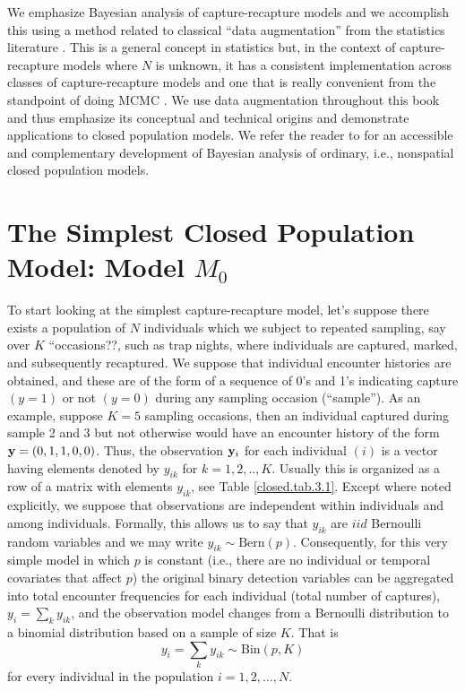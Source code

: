 We emphasize Bayesian analysis of capture-recapture models and we
accomplish this using a method related to classical ``data
augmentation'' from the statistics literature 
\citep[e.g.,][]{tanner_wong:1987}.  This is a general concept in
statistics but, in the context of capture-recapture models where $N$
is unknown, it has a consistent implementation across classes of
capture-recapture models and one that is really convenient from the
standpoint of doing MCMC \citep{royle_etal:2007,royle_dorazio:2011}. We use data
augmentation throughout this book and thus emphasize its conceptual
and technical origins and demonstrate applications to closed
population models.  We refer the reader to
\citet[][ch. 6]{kery_schaub:2011} for an accessible and complementary
development of Bayesian analysis of ordinary, i.e., nonspatial closed population models. 


\section{The Simplest Closed Population Model: Model $M_0$}

To start looking at the simplest capture-recapture model, let's suppose  
there exists a population of $N$ individuals which we
subject to repeated sampling, say over $K$ ``occasions??, such as trap nights, where individuals
are captured, marked, and subsequently recaptured.  We suppose that
individual encounter histories are obtained, and these are of the form
of a sequence of 0's and 1's indicating capture $(y=1)$ or not $(y=0)$
during any sampling occasion (``sample'').  As an example, suppose
$K=5$ sampling occasions, then an individual captured during sample 2
and 3 but not otherwise would have an encounter history of the form
${\bf y}=(0,1,1,0,0)$. Thus, the observation ${\bf y}_{i}$ for each
individual $(i)$ is a vector having elements denoted by $y_{ik}$ for
$k=1,2,..,K$. Usually this is organized as a row of a matrix with
elements $y_{ik}$, see Table \ref{closed.tab.3.1}.  Except where noted
explicitly, we suppose that observations are independent within
individuals and among individuals.  Formally, this allows us to say
that $y_{ik}$ are $iid$ Bernoulli random variables and we may write $y_{ik}
\sim \mbox{Bern}(p)$.  Consequently, for this very simple model in
which $p$ is constant (i.e., there are no individual or temporal
covariates that affect $p$) the original binary detection variables
can be aggregated into total encounter frequencies for each individual
(total number of captures), $y_{i} = \sum_{k} y_{ik}$, and the
observation model changes from a Bernoulli distribution to a 
binomial distribution based on a sample of size $K$. That is
\[
y_{i}  = \sum_{k} y_{ik} \sim \mbox{Bin}(p,K)
\]
for every individual in the population $i=1,2,\ldots,N$. 

